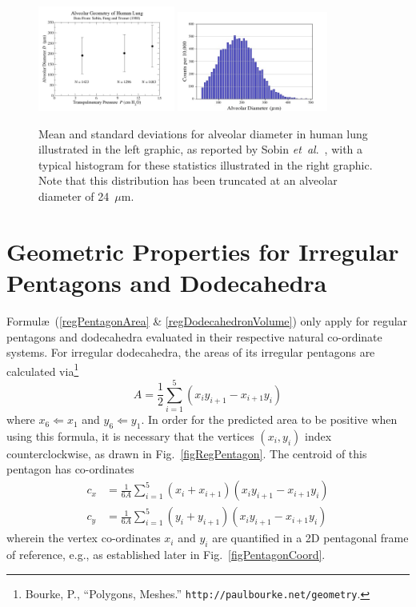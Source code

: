 \begin{figure}
	\centering
	\includegraphics[width=0.4\textwidth]{figures/septalLength.jpg}
    \includegraphics[width=0.44\textwidth]{figures/alveolarDiaHistogram.jpg}
	\caption{Mean and standard deviations for alveolar diameter in human lung illustrated in the left graphic, as reported by Sobin \textit{et~al}.\ \cite{Sobinetal88}, with a typical histogram for these statistics illustrated in the right graphic.  Note that this distribution has been truncated at an alveolar diameter of 24~$\mu$m.}
	\label{septalLengthFig}
\end{figure}

\section{Geometric Properties for Irregular Pentagons and Dodecahedra}
\label{sec:geometries}

Formul\ae\ (\ref{regPentagonArea} \& \ref{regDodecahedronVolume}) only apply for regular pentagons and dodecahedra evaluated in their respective natural co-ordinate systems.  For irregular dodecahedra, the areas of its irregular pentagons are calculated via\footnote{
	Bourke, P., ``Polygons, Meshes.'' \texttt{http://paulbourke.net/geometry}.
}
\begin{equation}
	A = \frac{1}{2} \sum_{i=1}^5 ( x_i y_{i+1} - x_{i+1} y_i)
	\label{irregularPentagonArea}
\end{equation}
where $x_6 \Leftarrow x_1$ and $y_6 \Leftarrow y_1$.  In order for the predicted area to be positive when using this formula, it is necessary that the vertices $(x_i , y_i)$ index counterclockwise, as drawn in Fig.~\ref{figRegPentagon}.  The centroid of this pentagon has co-ordinates\footnotemark[\value{footnote}]
\begin{subequations}
	\label{centroidPentagon}
	\begin{align}
		c_x & = \frac{1}{6 A} \sum_{i=1}^5 (x_i + x_{i+1})
			( x_i y_{i+1} - x_{i+1} y_i) \\
		c_y & = \frac{1}{6 A} \sum_{i=1}^5 (y_i + y_{i+1})
		( x_i y_{i+1} - x_{i+1} y_i)
	\end{align}
\end{subequations}
wherein the vertex co-ordinates $x_i$ and $y_i$ are quantified in a 2D pentagonal frame of reference, e.g., as established later in Fig.~\ref{figPentagonCoord}.

